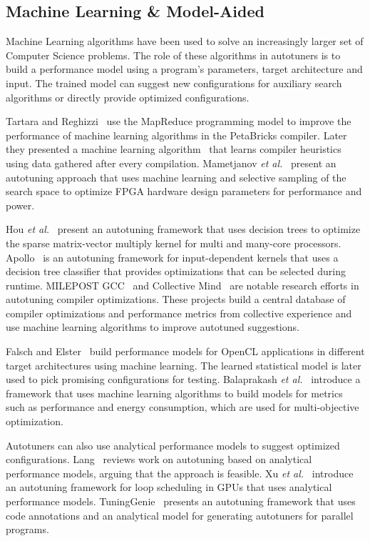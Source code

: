 \subsection{Machine Learning \& Model-Aided}

Machine Learning algorithms have been used to solve an increasingly larger set
of Computer Science problems. The role of these algorithms in autotuners is to
build a performance model using a program's parameters, target architecture and
input.  The trained model can suggest new configurations for auxiliary search
algorithms or directly provide optimized configurations.

Tartara and Reghizzi~\cite{tartara2012parallel} use the MapReduce programming
model to improve the performance of machine learning algorithms in the
PetaBricks compiler. Later they presented a machine learning
algorithm~\cite{tartara2013continuous} that learns compiler heuristics using
data gathered after every compilation.  Mametjanov \emph{et
al.}~\cite{mametjanov2015autotuning} present an autotuning approach that uses
machine learning and selective sampling of the search space to optimize FPGA
hardware design parameters for performance and power.

Hou \emph{et al.}~\cite{hou2017auto} present an autotuning framework that uses
decision trees to optimize the sparse matrix-vector multiply kernel for multi
and many-core processors.  Apollo~\cite{beckingsale2017apollo} is an autotuning
framework for input-dependent kernels that uses a decision tree classifier that
provides optimizations that can be selected during runtime. MILEPOST
GCC~\cite{fursin2011milepost} and Collective Mind~\cite{fursin2015collective}
are notable research efforts in autotuning compiler optimizations.  These
projects build a central database of compiler optimizations and performance
metrics from collective experience and use machine learning algorithms to
improve autotuned suggestions.

Falsch and Elster~\cite{falch2017machine} build performance
models for OpenCL applications in different target architectures using machine
learning.  The learned statistical model is later used to pick promising
configurations for testing.  Balaprakash \emph{et
al.}~\cite{balaprakash2016automomml} introduce a framework that uses machine
learning algorithms to build models for metrics such as performance and energy
consumption, which are used for multi-objective optimization.

Autotuners can also use analytical performance models to suggest optimized
configurations.  Lang~\cite{lang2017data} reviews work on autotuning based on
analytical performance models, arguing that the approach is feasible.  Xu
\emph{et al.}~\cite{xu2016analytical} introduce an autotuning framework for
loop scheduling in GPUs that uses analytical performance models.
TuningGenie~\cite{ivanenko2014method} presents an autotuning framework that
uses code annotations and an analytical model for generating autotuners for
parallel programs.

